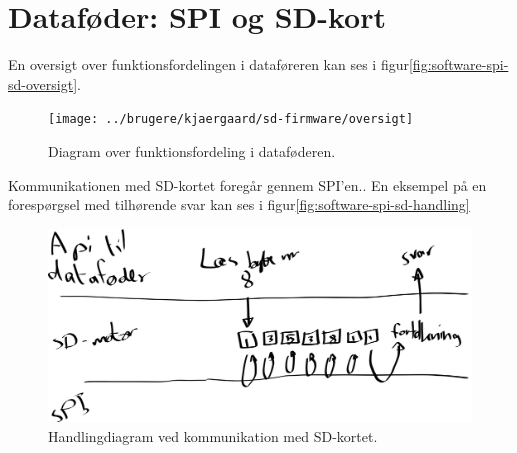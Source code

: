 \section{Dataføder: SPI og SD-kort}

En oversigt over funktionsfordelingen i
dataføreren kan ses i
figur\vref{fig:software-spi-sd-oversigt}.

\begin{figure}[htbp]
  \centering
  \texttt{[image: ../brugere/kjaergaard/sd-firmware/oversigt]}
  \caption{Diagram over funktionsfordeling i dataføderen.}
  \label{fig:software-spi-sd-oversigt}
\end{figure}

Kommunikationen med SD-kortet foregår gennem SPI'en.. En eksempel på en forespørgsel med tilhørende svar
kan ses i figur\vref{fig:software-spi-sd-handling}

\begin{figure}[htbp]
  \centering
  \includegraphics[width=\textwidth]{../brugere/kjaergaard/sd-firmware/handling}
  \caption{Handlingdiagram ved kommunikation med SD-kortet.}
  \label{fig:software-spi-sd-handling}
\end{figure}

